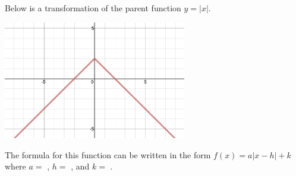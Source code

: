 \documentclass{ximera}
\begin{document}
\begin{question}
Below is a transformation of the parent function $y=|x|$. 
\begin{image}
\includegraphics[width=8cm]{Transformations/neg_x_+2.png}
\end{image}
The formula for this function can be written in the form $f(x)=a|x-h|+k$ where $a=$ , $h=$ , and $k=$ .
\end{question}
\end{document}
